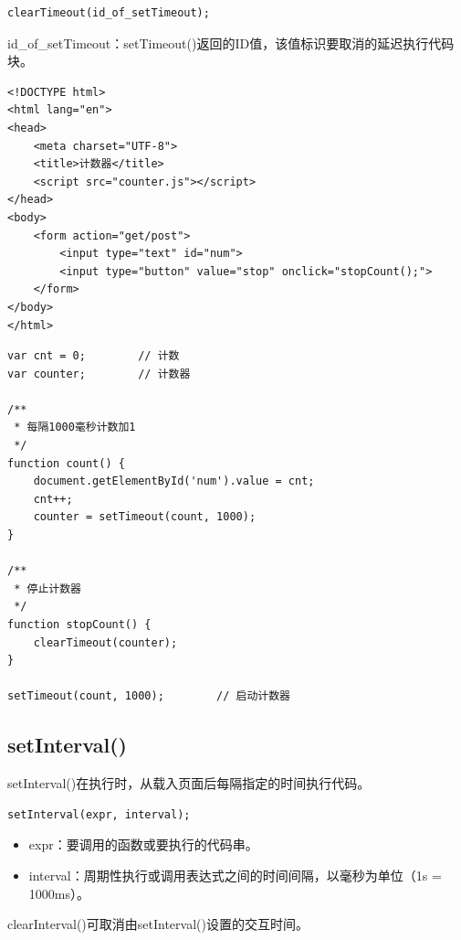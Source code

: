 \begin{lstlisting}[style=htmlcssjs]
clearTimeout(id_of_setTimeout);
\end{lstlisting}

id\_of\_setTimeout：setTimeout()返回的ID值，该值标识要取消的延迟执行代码块。\\


\begin{lstlisting}[style=htmlcssjs, title=counter.html]
<!DOCTYPE html>
<html lang="en">
<head>
    <meta charset="UTF-8">
    <title>计数器</title>
    <script src="counter.js"></script>
</head>
<body>
    <form action="get/post">
        <input type="text" id="num">
        <input type="button" value="stop" onclick="stopCount();">
    </form>
</body>
</html>
\end{lstlisting}

\begin{lstlisting}[style=htmlcssjs, title=counter.js]
var cnt = 0;        // 计数
var counter;        // 计数器

/**
 * 每隔1000毫秒计数加1
 */
function count() {
    document.getElementById('num').value = cnt;
    cnt++;
    counter = setTimeout(count, 1000);
}

/**
 * 停止计数器
 */
function stopCount() {
    clearTimeout(counter);
}

setTimeout(count, 1000);        // 启动计数器
\end{lstlisting}

\vspace{0.5cm}

\subsection{setInterval()}

setInterval()在执行时，从载入页面后每隔指定的时间执行代码。\\

\begin{lstlisting}[style=htmlcssjs]
setInterval(expr, interval);
\end{lstlisting}

\begin{itemize}
	\item expr：要调用的函数或要执行的代码串。
	\item interval：周期性执行或调用表达式之间的时间间隔，以毫秒为单位（1s = 1000ms）。
\end{itemize}

clearInterval()可取消由setInterval()设置的交互时间。\\

